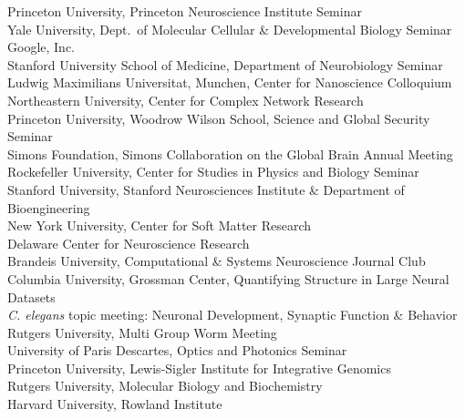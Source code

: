 \documentclass[11pt]{article}
\begin{document}
Princeton University, Princeton Neuroscience Institute Seminar \\
Yale University, Dept.~of Molecular Cellular \& Developmental Biology Seminar \\
Google, Inc. \\
Stanford University School of Medicine, Department of Neurobiology Seminar \\
Ludwig Maximilians Universitat, Munchen, Center for Nanoscience Colloquium \\
Northeastern University, Center for Complex Network Research  \\ 
Princeton University, Woodrow Wilson School, Science and Global Security Seminar \\
Simons Foundation, Simons Collaboration on the Global Brain Annual Meeting \\
Rockefeller University, Center for Studies in Physics and Biology Seminar \\
 Stanford University, Stanford Neurosciences Institute \& Department of Bioengineering \\
 New York University, Center for Soft Matter Research \\
 Delaware Center for Neuroscience Research  \\
  Brandeis University, Computational \& Systems Neuroscience Journal Club \\
 Columbia University, Grossman Center, Quantifying Structure in Large Neural Datasets \\
 \textit{C. elegans} topic meeting: Neuronal Development, Synaptic Function
\& Behavior \\ 
 Rutgers University, Multi Group Worm Meeting   \\
University of Paris Descartes, Optics and Photonics Seminar \\
 Princeton University, Lewis-Sigler Institute for Integrative Genomics  \\
 Rutgers University,  Molecular Biology and Biochemistry \\
 Harvard University, Rowland Institute   \\
\end{document}
